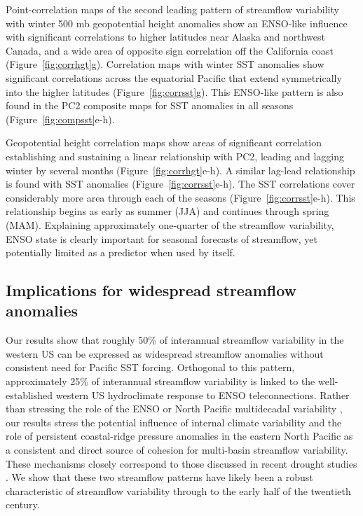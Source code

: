 \documentclass[final, double]{ua-thesis}
\begin{document}
Point-correlation maps of the second leading pattern of streamflow variability with winter 500 mb geopotential height anomalies show an ENSO-like influence with significant correlations to higher latitudes near Alaska and northwest Canada, and a wide area of opposite sign correlation off the California coast (Figure~\ref{fig:corrhgt}g). Correlation maps with winter SST anomalies show significant correlations across the equatorial Pacific that extend symmetrically into the higher latitudes (Figure~\ref{fig:corrsst}g). This ENSO-like pattern is also found in the PC2 composite maps for SST anomalies in all seasons (Figure~\ref{fig:compsst}e-h).

Geopotential height correlation maps show areas of significant correlation establishing and sustaining a linear relationship with PC2, leading and lagging winter by several months (Figure~\ref{fig:corrhgt}e-h). A similar lag-lead relationship is found with SST anomalies (Figure~\ref{fig:corrsst}e-h). The SST correlations cover considerably more area through each of the seasons (Figure~\ref{fig:corrsst}e-h). This relationship begins as early as summer (JJA) and continues through spring (MAM). Explaining approximately one-quarter of the streamflow variability, ENSO state is clearly important for seasonal forecasts of streamflow, yet potentially limited as a predictor when used by itself.

\subsection{Implications for widespread streamflow anomalies}

Our results show that roughly 50\% of interannual streamflow variability in the western US can be expressed as widespread streamflow anomalies without consistent need for Pacific SST forcing. Orthogonal to this pattern, approximately 25\% of interannual streamflow variability is linked to the well-established western US hydroclimate response to ENSO teleconnections. Rather than stressing the role of the ENSO or North Pacific multidecadal variability \citep [e.g., ][]{1tootle_coupled_2005, 1sagarika_pacific_2016}, our results stress the potential influence of internal climate variability and the role of persistent coastal-ridge pressure anomalies in the eastern North Pacific as a consistent and direct source of cohesion for multi-basin streamflow variability. These mechanisms closely correspond to those discussed in recent drought studies \citep [e.g., ][]{1cook_worst_2014, 1seager_atmosphere_2014, 1teng_causes_2016, 1wise_five_2016}. We show that these two streamflow patterns have likely been a robust characteristic of streamflow variability through to the early half of the twentieth century.
\end{document}
